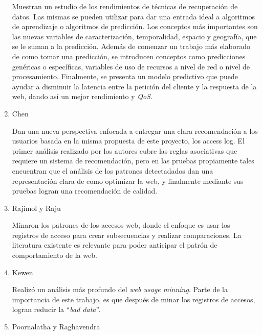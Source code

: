 \begin{enumerate}
	{  
  Muestran un estudio de los rendimientos de técnicas de recuperación de datos.
  Las mismas se pueden utilizar para dar una entrada ideal a algoritmos de aprendizaje o algoritmos de predicción. 
  Los conceptos más importantes son las nuevas variables de caracterización, temporalidad, espacio y geografía, que se le suman a la predicción. 
  Además de comenzar un trabajo más elaborado de como tomar una predicción, se introducen conceptos como predicciones genéricas o específicas, variables de uso de recursos a nivel de red o nivel de procesamiento.
  Finalmente, se presenta un modelo predictivo que puede ayudar a disminuir la latencia entre la petición del cliente y la respuesta de la web, dando así un mejor rendimiento y \emph{QoS}.
  
 }


  \item Chen \etal~\cite{Chen2011} 
  
	{  
	Dan una nueva perspectiva enfocada a entregar una clara recomendación a los usuarios basada en la misma propuesta de este proyecto, los access log.
	El primer análisis realizado por los autores cubre las reglas asociativas que requiere un sistema de recomendación, pero en las pruebas propiamente tales encuentran que el análisis de los patrones detectadados dan una representación clara de como optimizar la web, y finalmente mediante sus pruebas logran una recomendación de calidad.}
  \item Rajimol y Raju~\cite{Rajimol2012} 
	{  
	Minaron los patrones de los accesos web, donde el enfoque es usar los registros de acceso para crear subsecuencias y realizar comparaciones.
	La literatura existente es relevante para poder anticipar el patrón de comportamiento de la web.


	}
  \item Kewen~\cite{kewen2012} 
  
	{  
	Realizó un análisis más profundo del \emph{web usage minning}.
	Parte de la importancia de este trabajo, es que después de minar los registros de accesos, logran reducir la ``\emph{bad data}''.
	}

  \item Poornalatha y Raghavendra~\cite{Poornalatha2012}
  

\end{enumerate}
